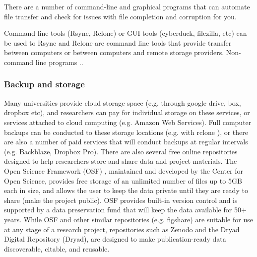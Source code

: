\documentclass[10pt,letterpaper]{article}
\begin{document}
There are a number of command-line and graphical programs that can automate file transfer and check for issues with file completion and corruption for you.

Command-line tools (Rsync, Rclone) or GUI tools (cyberduck, filezilla, etc) can be used to 
Rsync and Rclone are command line tools that provide transfer between computers or between computers and remote storage providers.
Non-command line programs ..

\subsubsection*{Backup and storage} 
Many universities provide cloud storage space (e.g. through google drive, box, dropbox etc), and researchers can pay for individual storage on these services, or services attached to cloud computing (e.g. Amazon Web Services). 
Full computer backups can be conducted to these storage locations (e.g. with rclone \cite{bailleul2016rclone}), or there are also a number of paid services that will conduct backups at regular intervals (e.g. Backblaze, Dropbox Pro). 
There are also several free online repositories designed to help researchers store and share data and project materials. 
The Open Science Framework (OSF) \cite{foster2017open}, maintained and developed by the Center for Open Science, provides free storage of an unlimited number of files up to 5GB each in size, and allows the user to keep the data private until they are ready to share (make the project public). 
OSF provides built-in version control and is supported by a data preservation fund that will keep the data available for 50+ years. 
While OSF and other similar repositories (e.g. figshare) are suitable for use at any stage of a research project, repositories such as Zenodo and the Dryad Digital Repository (Dryad), are designed to make publication-ready data discoverable, citable, and reusable. 

\end{document}
